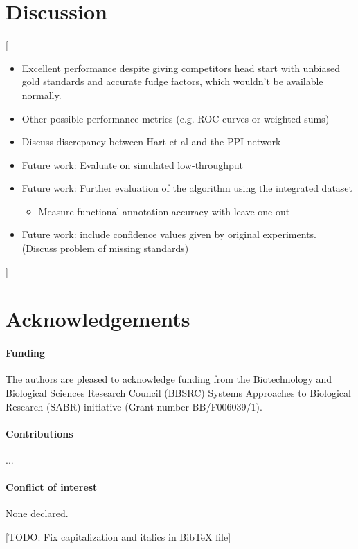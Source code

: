 \documentclass{bioinfo}
\newcommand{\note}[1]{{\color{red}[#1]}}
\begin{document}
\section{Discussion}
\note{
\begin{itemize}
  \item Excellent performance despite giving competitors head start with unbiased gold standards and accurate fudge factors, which wouldn't be available normally.
  \item Other possible performance metrics (e.g. ROC curves or weighted sums)
  \item Discuss discrepancy between Hart et al and the PPI network
  \item Future work: Evaluate on simulated low-throughput
  \item Future work: Further evaluation of the algorithm using the integrated dataset
  \begin{itemize}
    \item Measure functional annotation accuracy with leave-one-out
  \end{itemize}
  \item Future work: include confidence values given by original experiments. (Discuss problem of missing standards)
\end{itemize}
}



\section*{Acknowledgements}

\paragraph{Funding\textcolon} The authors are pleased to acknowledge funding from the Biotechnology and Biological Sciences Research Council (BBSRC) Systems Approaches to Biological Research (SABR) initiative (Grant number BB/F006039/1). 

\paragraph{Contributions\textcolon} ...

\paragraph{Conflict of interest\textcolon} None declared.





\note{TODO: Fix capitalization and italics in BibTeX file}
\end{document}
